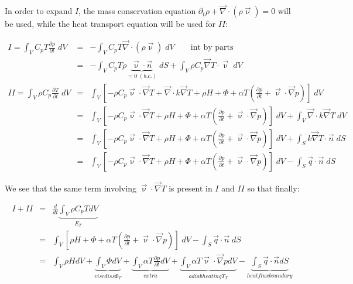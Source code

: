 \documentclass[a4paper,11pt]{article}
\newcommand{\nn}{\nonumber}
\begin{document}
In order to expand $I$, the mass conservation equation $\partial_t \rho + \vec\nabla\cdot(\rho \vec\upnu)=0$ will be used, 
while the heat transport equation will be used for $II$:

\begin{eqnarray}
I= \int_V C_p T \frac{\partial \rho}{\partial t} \; dV
&=& -\int_V C_p T {\vec\nabla} \cdot (\rho \vec{\upnu}) \; dV \qquad \text{int by parts} \nn\\
&=& -\int_V C_p T \rho \underbrace{ \vec{\upnu} \cdot \vec{n}}_{=0 \; (b.c.)} \; dS 
+  \int_V \rho C_p  \vec{\nabla}  T \cdot \vec{\upnu} \; dV
\\
II=\int_V \rho C_p \frac{\partial T}{\partial t}  \; dV
&=&  \int_V \left[ -\rho C_p \vec{\upnu}\cdot \vec{\nabla}T 
+{\vec\nabla}\cdot k {\vec\nabla} T + \rho H  + \Phi    
+\alpha T \left( \frac{\partial p}{\partial t}+  \vec\upnu \cdot {\vec\nabla} 
p \right) \right] \;  dV \nn\\ 
&=& 
 \int_V \left[ -\rho C_p \vec{\upnu}\cdot \vec{\nabla}T 
+ \rho H  + \Phi    +\alpha T \left( \frac{\partial p}{\partial t}
+ \vec\upnu \cdot {\vec\nabla} p \right) \right] \; dV 
+ \int_V {\vec\nabla}\cdot k {\vec\nabla} T \; dV \nn\\ 
&=& 
 \int_V \left[ -\rho C_p \vec{\upnu}\cdot {\vec\nabla}T 
+ \rho H  + \Phi    +\alpha T \left( \frac{\partial p}{\partial t}
+ \vec\upnu \cdot \vec{\nabla} p \right) \right] \; dV 
+ \int_S  k \vec{\nabla} T \cdot \vec{n} \;  dS \nn\\ 
&=& 
 \int_V \left[ -\rho C_p \vec{\upnu} \cdot \vec{\nabla}T 
+ \rho H  + \Phi    +\alpha T \left( \frac{\partial p}{\partial t}+  
\vec\upnu  \cdot \vec{\nabla} p \right) \right]  \;  dV 
- \int_S  \vec{q} \cdot \vec{n} \; dS  \nn
\label{ba004}
\end{eqnarray}

We see that the same term involving $\vec\upnu\cdot \vec\nabla T$
is present in $I$ and $II$ so that finally:

\begin{eqnarray}
I+II
&=&\frac{d}{dt} \underbrace{\int_V \rho C_p T dV }_{E_T} \nn\\
&=& 
\int_V \left[  \rho H  + \Phi    +\alpha T \left( \frac{\partial p}{\partial t}
+\vec\upnu \cdot \vec{\nabla} p \right) \right] \; dV 
-\int_S  \vec{q} \cdot \vec{n} \;  dS \\ 
&=& 
\int_V \rho H dV 
+\underbrace{\int_V \Phi  dV}_{{visc diss} \Phi_T }  
+\underbrace{\int_V \alpha T \frac{\partial p}{\partial t}  dV}_{{extra}}
+\underbrace{\int_V \alpha T \vec\upnu  \cdot \vec{\nabla} p  dV}_{{adiab heating} \Upsilon_T} 
- \underbrace{\int_S  \vec{q} \cdot \vec{n}  dS}_{{heatflux boundary}} 
\label{ba005}
\end{eqnarray}
\end{document}
